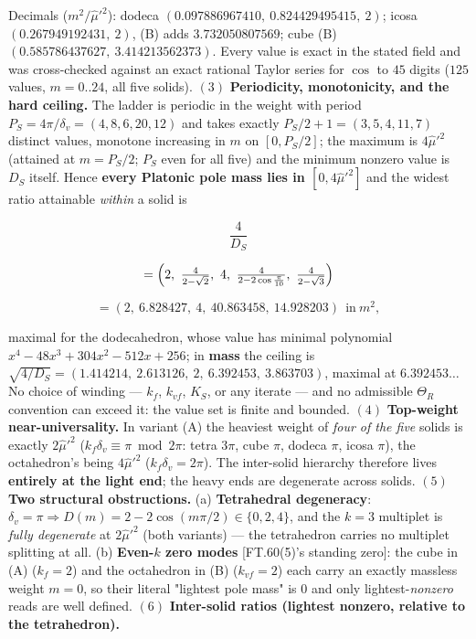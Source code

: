 \begin{theorem}
Decimals ($m^2/\hat\mu'^2$): dodeca $(0.097886967410,\ 0.824429495415,\ 2)$; icosa $(0.267949192431,\ 2)$, (B) adds $3.732050807569$; cube (B) $(0.585786437627,\ 3.414213562373)$. Every value is exact in the stated field and was cross-checked against an exact rational Taylor series for $\cos$ to $45$ digits ($125$ values, $m=0..24$, all five solids). $(3)$ \textbf{Periodicity, monotonicity, and the hard ceiling.} The ladder is periodic in the weight with period $P_S=4\pi/\delta_v=(4,8,6,20,12)$ and takes exactly $P_S/2+1=(3,5,4,11,7)$ distinct values, monotone increasing in $m$ on $[0,P_S/2]$; the maximum is $4\hat\mu'^2$ (attained at $m=P_S/2$; $P_S$ even for all five) and the minimum nonzero value is $D_S$ itself. Hence \textbf{every Platonic pole mass lies in $[0,4\hat\mu'^2]$} and the widest ratio attainable \textit{within} a solid is

\[
\frac{4}{D_S}
\]

\[
= \Bigl(2,\ \tfrac{4}{2-\sqrt2},\ 4,\ \tfrac{4}{2-2\cos\frac\pi{10}},\ \tfrac{4}{2-\sqrt3}\Bigr)
\]

\[
= (2,\ 6.828427,\ 4,\ 40.863458,\ 14.928203)\ \ \text{in}\ m^2,
\]

maximal for the dodecahedron, whose value has minimal polynomial $x^4-48x^3+304x^2-512x+256$; in \textbf{mass} the ceiling is $\sqrt{4/D_S}=(1.414214,\ 2.613126,\ 2,\ 6.392453,\ 3.863703)$, maximal at $6.392453\ldots$ No choice of winding — $k_f$, $k_{vf}$, $K_S$, or any iterate — and no admissible $\Theta_R$ convention can exceed it: the value set is finite and bounded. $(4)$ \textbf{Top-weight near-universality.} In variant (A) the heaviest weight of \textit{four of the five} solids is exactly $2\hat\mu'^2$ ($k_f\delta_v\equiv\pi\bmod 2\pi$: tetra $3\pi$, cube $\pi$, dodeca $\pi$, icosa $\pi$), the octahedron's being $4\hat\mu'^2$ ($k_f\delta_v=2\pi$). The inter-solid hierarchy therefore lives \textbf{entirely at the light end}; the heavy ends are degenerate across solids. $(5)$ \textbf{Two structural obstructions.} (a) \textbf{Tetrahedral degeneracy}: $\delta_v=\pi\Rightarrow D(m)=2-2\cos(m\pi/2)\in\{0,2,4\}$, and the $k=3$ multiplet is \textit{fully degenerate} at $2\hat\mu'^2$ (both variants) — the tetrahedron carries no multiplet splitting at all. (b) \textbf{Even-$k$ zero modes} [FT.60(5)'s standing zero]: the cube in (A) ($k_f=2$) and the octahedron in (B) ($k_{vf}=2$) each carry an exactly massless weight $m=0$, so their literal "lightest pole mass" is $0$ and only lightest-\textit{nonzero} reads are well defined. $(6)$ \textbf{Inter-solid ratios (lightest nonzero, relative to the tetrahedron).}


\end{theorem}
